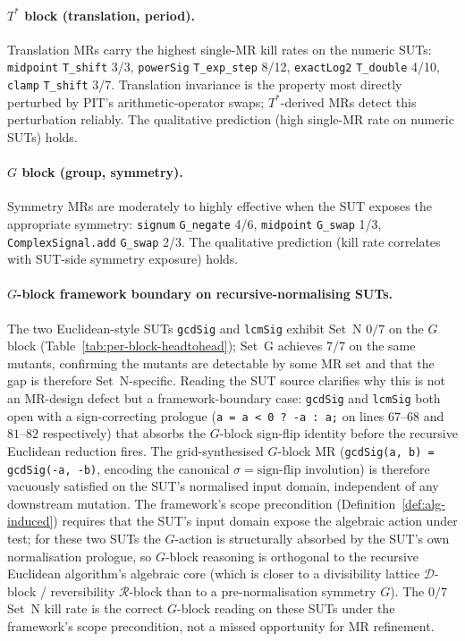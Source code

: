 \documentclass[acmsmall, screen]{acmart}
\begin{document}
\paragraph{$T^{*}$ block (translation, period).}
Translation MRs carry the highest single-MR kill rates on the numeric
SUTs: \texttt{midpoint} \texttt{T\_shift} 3/3, \texttt{powerSig}
\texttt{T\_exp\_step} 8/12, \texttt{exactLog2} \texttt{T\_double}
4/10, \texttt{clamp} \texttt{T\_shift} 3/7. Translation invariance is
the property most directly perturbed by PIT's arithmetic-operator
swaps; $T^{*}$-derived MRs detect this perturbation reliably. The
qualitative prediction (high single-MR rate on numeric SUTs) holds.

\paragraph{$G$ block (group, symmetry).}
Symmetry MRs are moderately to highly effective when the SUT exposes
the appropriate symmetry: \texttt{signum} \texttt{G\_negate} 4/6,
\texttt{midpoint} \texttt{G\_swap} 1/3, \texttt{ComplexSignal.add}
\texttt{G\_swap} 2/3. The qualitative prediction (kill rate correlates
with SUT-side symmetry exposure) holds.

\paragraph{$G$-block framework boundary on recursive-normalising SUTs.}
\label{para:g-block-euclidean-boundary}
The two Euclidean-style SUTs \texttt{gcdSig} and \texttt{lcmSig}
exhibit Set~N $0/7$ on the $G$ block (Table~\ref{tab:per-block-headtohead});
Set~G achieves $7/7$ on the same mutants, confirming the mutants are
detectable by some MR set and that the gap is therefore Set~N-specific.
Reading the SUT source clarifies why this is not an MR-design defect
but a framework-boundary case: \texttt{gcdSig} and \texttt{lcmSig}
both open with a sign-correcting prologue (\texttt{a = a < 0 ? -a : a;}
on lines $67$--$68$ and $81$--$82$ respectively) that absorbs the
$G$-block sign-flip identity before the recursive Euclidean reduction
fires. The grid-synthesised $G$-block MR
(\texttt{gcdSig(a, b) = gcdSig(-a, -b)}, encoding the canonical
$\sigma = \mathrm{sign\text{-}flip}$ involution) is therefore vacuously
satisfied on the SUT's normalised input domain, independent of any
downstream mutation. The framework's scope precondition
(Definition~\ref{def:alg-induced}) requires that the SUT's input
domain expose the algebraic action under test; for these two SUTs the
$G$-action is structurally absorbed by the SUT's own normalisation
prologue, so $G$-block reasoning is orthogonal to the recursive
Euclidean algorithm's algebraic core (which is closer to a divisibility
lattice $\mathcal{D}$-block / reversibility $\mathcal{R}$-block than
to a pre-normalisation symmetry $G$). The $0/7$ Set~N kill rate is the
correct $G$-block reading on these SUTs under the framework's
scope precondition, not a missed opportunity for MR refinement.
\end{document}
